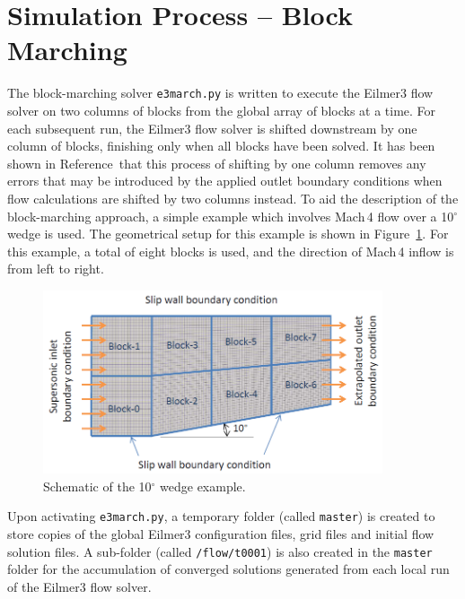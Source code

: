 \documentclass[12pt,a4paper,twoside]{article}
\begin{document}
\section{Simulation Process -- Block Marching}
%
The block-marching solver \texttt{e3march.py} is written to execute the Eilmer3 flow solver 
on two columns of blocks from the global array of blocks at a time. For each subsequent run, 
the Eilmer3 flow solver is shifted downstream by one column of blocks, finishing only when 
all blocks have been solved. It has been shown in Reference\,\cite{zander_etal_2011b} that
this process of shifting by one column removes any errors that may be introduced by the 
applied outlet boundary conditions when flow calculations are shifted by two columns instead. 
To aid the description of the block-marching approach, a simple example which involves 
Mach\,4 flow over a 10$^\circ$ wedge is used. The geometrical setup for this example is 
shown in Figure~\ref{f:10-deg-wedge-schema}. For this example, a total of eight blocks is 
used, and the direction of Mach\,4 inflow is from left to right.
%
\begin{figure}[htbp]
   \centerline{ \includegraphics[width=10cm]{figs/10-deg-wedge-schematic.png} }
   \caption{Schematic of the 10$^\circ$ wedge example.}
   \label{f:10-deg-wedge-schema}
\end{figure}

\medskip
Upon activating \texttt{e3march.py}, a temporary folder (called \texttt{master}) is 
created to store copies of the global Eilmer3 configuration files, grid files and initial 
flow solution files. A sub-folder (called \texttt{/flow/t0001}) is also created in the 
\texttt{master} folder for the accumulation of converged solutions generated from each 
local run of the Eilmer3 flow solver. 
\end{document}
